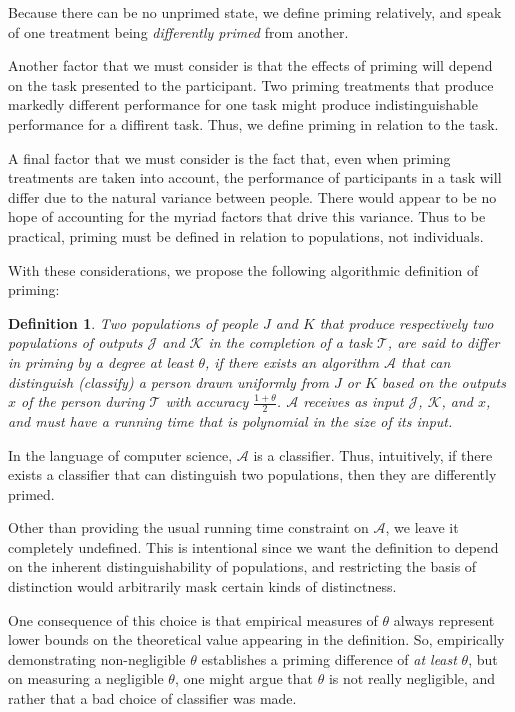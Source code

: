 \documentclass[a4paper]{report}
\newtheorem*{mydef}{Definition}
\begin{document}
Because there
can be no unprimed state, we define priming relatively, and speak of one
treatment being \textit{differently primed} from another.

Another factor that we must consider is that the effects of priming will
depend on the task presented to the participant.  Two priming treatments that
produce markedly different performance for one task might produce 
indistinguishable performance for a diffirent task.  Thus, we define priming
in relation to the task.

A final factor that we must consider is the fact that, even when priming 
treatments are taken into account, the performance of participants in a task 
will differ due to the natural variance between people.  There would appear to
be no hope of accounting for the myriad factors that drive this variance.  Thus
to be practical, priming must be defined in relation to populations, not
individuals.

With these considerations, we propose the following algorithmic definition of
priming:

\begin{mydef}
	Two populations of people $J$ and $K$ that produce respectively two 
	populations of outputs $\mathcal{J}$ and $\mathcal{K}$ in the completion
	of a task $\mathcal{T}$, are said to \emph{differ in priming by 
	a degree at least $\theta$}, if there exists an algorithm $\mathcal{A}$ 
	that can distinguish (classify)
	a person drawn uniformly from $J$ or $K$ based on the outputs $x$ of the 
	person during $\mathcal{T}$ with accuracy $\frac{1+\theta}{2}$.
	$\mathcal{A}$ receives as input $\mathcal{J}$, $\mathcal{K}$, and $x$,
	and must have a running time that is polynomial in the size of its input.
\end{mydef}

In the language of computer science, $\mathcal{A}$ is a classifier.  Thus,
intuitively, if there exists a classifier that can distinguish two populations,
then they are differently primed.

Other than providing the usual running time constraint on $\mathcal{A}$, we
leave it completely undefined.  This is intentional since we want the 
definition to depend on the inherent distinguishability of populations, and
restricting the basis of distinction would arbitrarily mask certain kinds of
distinctness.

One consequence of this choice is that empirical measures of $\theta$ always
represent lower bounds on the theoretical value appearing in the definition.
So, empirically demonstrating non-negligible $\theta$ establishes a priming 
difference of \textit{at least} $\theta$, but on measuring a negligible 
$\theta$, one might argue that $\theta$ is not really negligible, and rather 
that a bad choice of classifier was made.
\end{document}
